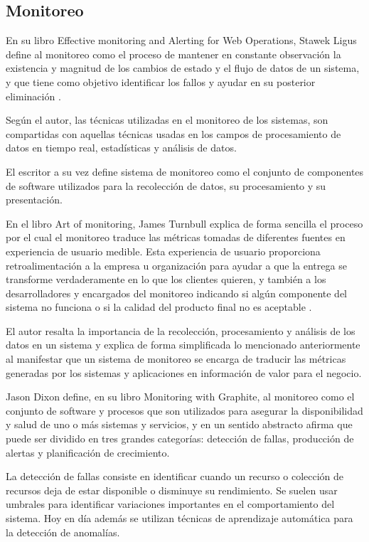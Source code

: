 \subsection{Monitoreo}
\label{monitoreo}
En su libro Effective monitoring and Alerting for Web Operations, Stawek Ligus
define al monitoreo como el proceso de mantener en constante observación la
existencia y magnitud de los cambios de estado y el flujo de datos de un
sistema, y que tiene como objetivo identificar los fallos y ayudar en su
posterior eliminación \cite[p.~2]{monitoreo:efective_monitoring_and_alerting}.

Según el autor, las técnicas utilizadas en el monitoreo de los sistemas, son
compartidas con aquellas técnicas usadas en los campos de procesamiento de
datos en tiempo real, estadísticas y análisis de datos.

El escritor a su vez define sistema de monitoreo como el conjunto de
componentes de software utilizados para la recolección de datos, su
procesamiento y su presentación.

En el libro Art of monitoring, James Turnbull explica de forma sencilla el
proceso por el cual el monitoreo traduce las métricas tomadas de diferentes
fuentes en experiencia de usuario medible. Esta experiencia de usuario
proporciona retroalimentación a la empresa u organización para ayudar a que la
entrega se transforme verdaderamente en lo que los clientes quieren, y también
a los desarrolladores y encargados del monitoreo indicando si algún componente
del sistema no funciona o si la calidad del producto final no es aceptable
\cite[p.~8]{monitoreo:art_of_monitoring}.

El autor resalta la importancia de la recolección, procesamiento y análisis de
los datos en un sistema y explica de forma simplificada lo mencionado
anteriormente al manifestar que un sistema de monitoreo se encarga de traducir
las métricas generadas por los sistemas y aplicaciones en información de valor
para el negocio.

Jason Dixon define, en su libro Monitoring with Graphite, al monitoreo como el
conjunto de software y procesos que son utilizados para asegurar la
disponibilidad y salud de uno o más sistemas y servicios, y en un sentido
abstracto afirma que puede ser dividido en tres grandes categorías: detección
de fallas, producción de alertas y planificación de crecimiento.

La detección de fallas consiste en identificar cuando un recurso o colección de
recursos deja de estar disponible o disminuye su rendimiento. Se suelen usar
umbrales para identificar variaciones importantes en el comportamiento del
sistema. Hoy en día además se utilizan técnicas de aprendizaje automática para
la detección de anomalías.


